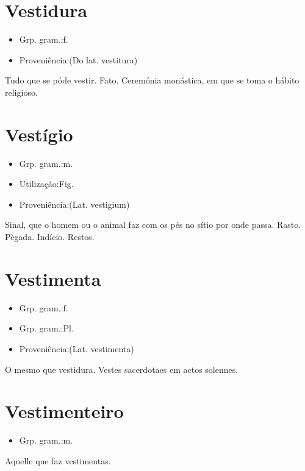 \documentclass{article}
\begin{document}
\section{Vestidura}
\begin{itemize}
\item {Grp. gram.:f.}
\end{itemize}
\begin{itemize}
\item {Proveniência:(Do lat. \textunderscore vestitura\textunderscore )}
\end{itemize}
Tudo que se póde vestir.
Fato.
Ceremónia monástica, em que se toma o hábito religioso.
\section{Vestígio}
\begin{itemize}
\item {Grp. gram.:m.}
\end{itemize}
\begin{itemize}
\item {Utilização:Fig.}
\end{itemize}
\begin{itemize}
\item {Proveniência:(Lat. \textunderscore vestigium\textunderscore )}
\end{itemize}
Sinal, que o homem ou o animal faz com os pés no sítio por onde passa.
Rasto.
Pègada.
Indício.
Restos.
\section{Vestimenta}
\begin{itemize}
\item {Grp. gram.:f.}
\end{itemize}
\begin{itemize}
\item {Grp. gram.:Pl.}
\end{itemize}
\begin{itemize}
\item {Proveniência:(Lat. \textunderscore vestimenta\textunderscore )}
\end{itemize}
O mesmo que \textunderscore vestidura\textunderscore .
Vestes sacerdotaes em actos solennes.
\section{Vestimenteiro}
\begin{itemize}
\item {Grp. gram.:m.}
\end{itemize}
Aquelle que faz vestimentas.
\end{document}
